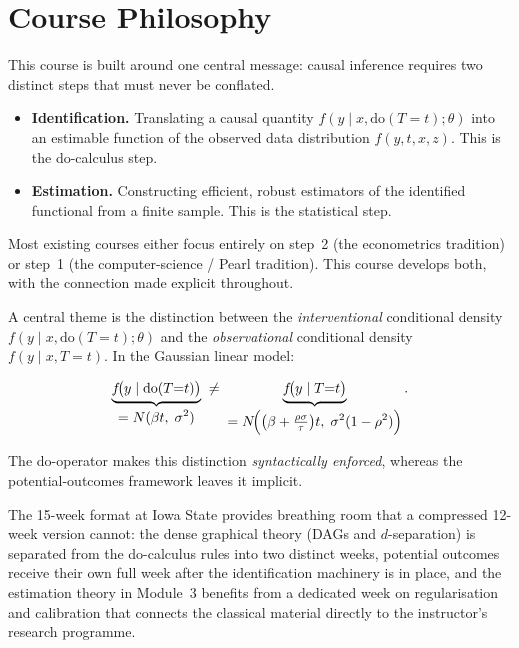 \documentclass[12pt]{article}
\begin{document}
\section{Course Philosophy}

This course is built around one central message: causal inference requires
two distinct steps that must never be conflated.

\begin{itemize}
  \item \textbf{Identification.}  Translating a causal quantity
    $f(y \mid x, \mathrm{do}(T{=}t); \theta)$ into an estimable function
    of the observed data distribution $f(y,t,x,z)$.  This is the
    do-calculus step.

  \item \textbf{Estimation.}  Constructing efficient, robust estimators
    of the identified functional from a finite sample.  This is the
    statistical step.
\end{itemize}

Most existing courses either focus entirely on step~2 (the econometrics
tradition) or step~1 (the computer-science / Pearl tradition).  This course
develops both, with the connection made explicit throughout.

\medskip
A central theme is the distinction between the \emph{interventional}
conditional density $f(y \mid x, \mathrm{do}(T{=}t); \theta)$ and the
\emph{observational} conditional density $f(y \mid x, T{=}t)$. In the
Gaussian linear model:

\begin{keybox}
\[
  \underbrace{f\!\bigl(y \mid \mathrm{do}(T{=}t)\bigr)}_{\displaystyle
    = N(\beta t,\;\sigma^2)}
  \;\neq\;
  \underbrace{f\!\bigl(y \mid T{=}t\bigr)}_{\displaystyle
    = N\!\Bigl(\bigl(\beta + \tfrac{\rho\sigma}{\tau}\bigr)t,\;
              \sigma^2(1-\rho^2)\Bigr)}.
\]
\end{keybox}

The do-operator makes this distinction \emph{syntactically enforced},
whereas the potential-outcomes framework leaves it implicit.

The 15-week format at Iowa State provides breathing room that a compressed
12-week version cannot: the dense graphical theory (DAGs and $d$-separation)
is separated from the do-calculus rules into two distinct weeks, potential
outcomes receive their own full week after the identification machinery is
in place, and the estimation theory in Module~3 benefits from a
dedicated week on regularisation and calibration that connects the classical
material directly to the instructor's research programme.
\end{document}
